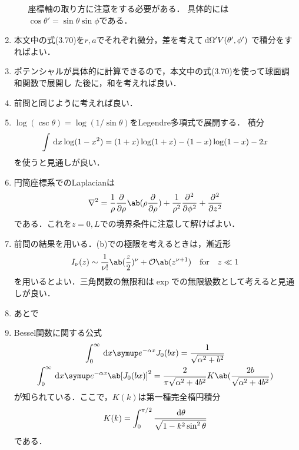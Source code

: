\begin{enumerate}[label={\large 3.\arabic*}]
\begin{enumerate}[(a)]
        座標軸の取り方に注意をする必要がある．
        具体的には$\cos\theta' = \sin\theta \sin\phi$である．
    \end{enumerate}%
  \item 本文中の式(3.70)を$r,a$でそれぞれ微分，差を考えて$\dl{\Omega'} V(\theta',\phi')$
    で積分をすればよい．
  \item ポテンシャルが具体的に計算できるので，本文中の式(3.70)を使って球面調和関数で展開し
    た後に，和を考えれば良い．
  \item 前問と同じように考えれば良い．
  \item $\log(\csc\theta) = \log(1/\sin\theta)$をLegendre多項式で展開する．
    積分
    \begin{gather}%
      \int \dl{x} \log(1-x^2) = (1+x)\log(1+x) - (1-x)\log(1-x) - 2x
    \end{gather}%
    を使うと見通しが良い．
  \item 円筒座標系でのLaplacianは
    \begin{gather}%
      \gr^2 = \frac{1}{\rho}\diffp**{\rho}{\ab(\rho\diffp{}{\rho})} + \frac{1}{\rho^2} \diffp[2]{}{\phi} + \diffp[2]{}{z}
    \end{gather}%
    である．これを$z=0,L$での境界条件に注意して解けばよい．
  \item 前問の結果を用いる．(b)での極限を考えるときは，漸近形
    \begin{gather}%
      I_\nu(z) \sim \frac{1}{\nu !}\ab(\frac{z}{2})^\nu + \order{z^{\nu+1}} \qqtext{for} z \ll 1
    \end{gather}%
     を用いるとよい．三角関数の無限和は$\exp$での無限級数として考えると見通しが良い．
   \item あとで
   \item Bessel関数に関する公式
     \begin{gather}%
       \int_0^\infty \dl{x} \e^{-\alpha x} J_0(bx) = \frac{1}{\sqrt{\alpha^2 + b^2}}\\
       \int_0^\infty \dl{x} \e^{-\alpha x} \ab[J_0(bx)]^2 = \frac{2}{\pi \sqrt{\alpha^2 + 4b^2}} 
       K\ab(\frac{2b}{\sqrt{\alpha^2 + 4b^2}})
     \end{gather}%
     が知られている．ここで，$K(k)$は第一種完全楕円積分
     \begin{gather}%
       K(k) = \int_0^{\pi/2} \frac{\dl{\theta}}{\sqrt{1-k^2\sin^2\theta}}
     \end{gather}%
     である．
\end{enumerate}
